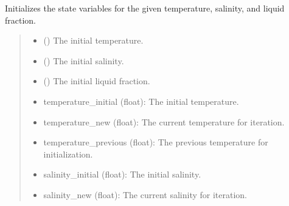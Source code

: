 \documentclass[a4paper,11pt,english,openany]{sphinxmanual}
\begin{document}
\begin{fulllineitems}
\label{\detokenize{api/spyice.statevariables:spyice.statevariables.initialize_statevariables}}
\pysigstartsignatures
{}
\pysigstopsignatures
\sphinxAtStartPar
Initializes the state variables for the given temperature, salinity, and liquid fraction.
\begin{quote}\begin{description}
\begin{itemize}
\item {} 
\sphinxAtStartPar
{} () \textendash{} The initial temperature.

\item {} 
\sphinxAtStartPar
{} () \textendash{} The initial salinity.

\item {} 
\sphinxAtStartPar
{} () \textendash{} The initial liquid fraction.

\end{itemize}

\sphinxAtStartPar
\begin{description}
\begin{itemize}
\item {} 
\sphinxAtStartPar
temperature\_initial (float): The initial temperature.

\item {} 
\sphinxAtStartPar
temperature\_new (float): The current temperature for iteration.

\item {} 
\sphinxAtStartPar
temperature\_previous (float): The previous temperature for initialization.

\item {} 
\sphinxAtStartPar
salinity\_initial (float): The initial salinity.

\item {} 
\sphinxAtStartPar
salinity\_new (float): The current salinity for iteration.


\end{itemize}
\end{description}
\end{description}
\end{quote}
\end{fulllineitems}
\end{document}

